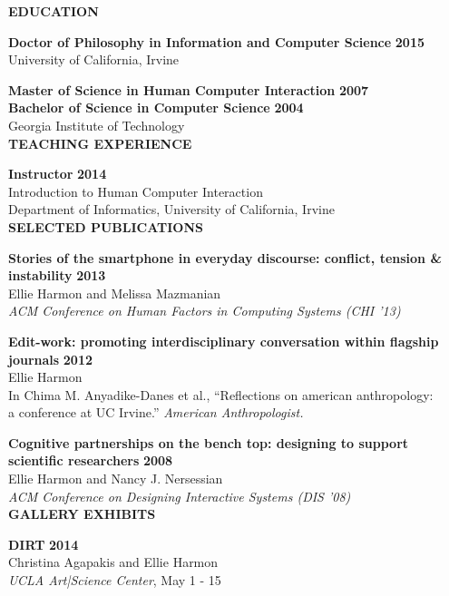 \newcommand{\mypubentry}[4]{
    \textbf{#1} \hfill \textbf{#2} \\ 
    #3 \\
		#4
}

\curriculumvitae
{

\textbf{EDUCATION}
 
    \textbf{Doctor of Philosophy in Information and Computer Science} \hfill \textbf{2015}\\
    University of California, Irvine
  
    \textbf{Master of Science in Human Computer Interaction} \hfill \textbf{2007} \\
    \textbf{Bachelor of Science in Computer Science} \hfill \textbf{2004} \\
    Georgia Institute of Technology\\

\textbf{TEACHING EXPERIENCE}

    \textbf{Instructor} \hfill \textbf{2014} \\
    Introduction to Human Computer Interaction \\
    Department of Informatics, University of California, Irvine\\

	
\textbf{SELECTED PUBLICATIONS}

  \mypubentry{Stories of the smartphone in everyday discourse: conflict, tension \& instability}{2013}{Ellie Harmon and Melissa Mazmanian}{\emph{ACM Conference on Human Factors in Computing Systems (CHI '13)}}
	
  \mypubentry{Edit-work: promoting interdisciplinary conversation within flagship journals}{2012}{Ellie Harmon}{In Chima M. Anyadike-Danes et al., ``Reflections on american anthropology: \\
	a conference at UC Irvine.''\emph{ American Anthropologist.}}
	
  \mypubentry{Cognitive partnerships on the bench top: designing to support scientific researchers}{2008}{Ellie Harmon and Nancy J. Nersessian}{\emph{ACM Conference on Designing Interactive Systems (DIS '08)}}\\
	
	\textbf{GALLERY EXHIBITS}
	
		\mypubentry{DIRT}{2014}{Christina Agapakis and Ellie Harmon}{\emph{UCLA Art|Science Center}, May 1 - 15}

}

